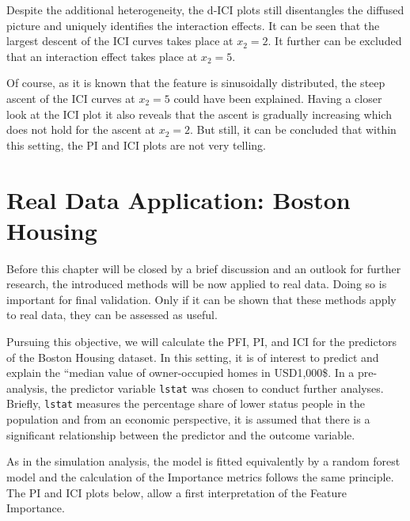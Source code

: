\documentclass[]{krantz}
\begin{document}
Despite the additional heterogeneity, the d-ICI plots still disentangles
the diffused picture and uniquely identifies the interaction effects. It
can be seen that the largest descent of the ICI curves takes place at
\(x_2 = 2\). It further can be excluded that an interaction effect takes
place at \(x_2 = 5\).

Of course, as it is known that the feature is sinusoidally distributed,
the steep ascent of the ICI curves at \(x_2 = 5\) could have been
explained. Having a closer look at the ICI plot it also reveals that the
ascent is gradually increasing which does not hold for the ascent at
\(x_2 = 2\). But still, it can be concluded that within this setting,
the PI and ICI plots are not very telling.

\pagebreak
\pagebreak

\section{Real Data Application: Boston Housing}\label{ch4}

Before this chapter will be closed by a brief discussion and an outlook
for further research, the introduced methods will be now applied to real
data. Doing so is important for final validation. Only if it can be
shown that these methods apply to real data, they can be assessed as
useful.

Pursuing this objective, we will calculate the PFI, PI, and ICI for the
predictors of the Boston Housing dataset. In this setting, it is of
interest to predict and explain the ``median value of owner-occupied
homes in USD1,000\$. In a pre-analysis, the predictor variable
\texttt{lstat} was chosen to conduct further analyses. Briefly,
\texttt{lstat} measures the percentage share of lower status people in
the population and from an economic perspective, it is assumed that
there is a significant relationship between the predictor and the
outcome variable.

As in the simulation analysis, the model is fitted equivalently by a
random forest model and the calculation of the Importance metrics
follows the same principle. The PI and ICI plots below, allow a first
interpretation of the Feature Importance.
\end{document}
